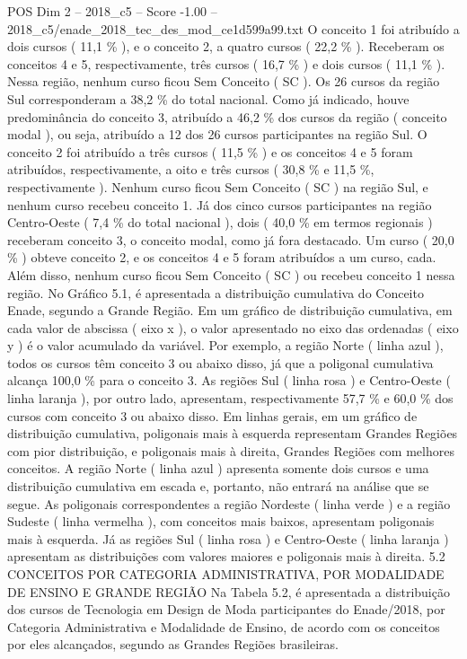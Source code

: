 \begin{textsample}{POS Dim 2 – 2018\_c5 – Score -1.00 – 2018\_c5/enade\_2018\_tec\_des\_mod\_ce1d599a99.txt}
O conceito 1 foi atribuído a dois cursos ( 11,1 \% ), e o conceito 2, a quatro cursos ( 22,2 \% ).
Receberam os conceitos 4 e 5, respectivamente, três cursos ( 16,7 \% ) e dois cursos ( 11,1 \% ).
Nessa região, nenhum curso ficou Sem Conceito ( SC ).
Os 26 cursos da região Sul corresponderam a 38,2 \% do total nacional.
Como já indicado, houve predominância do conceito 3, atribuído a 46,2 \% dos cursos da região ( conceito modal ), ou seja, atribuído a 12 dos 26 cursos participantes na região Sul.
O conceito 2 foi atribuído a três cursos ( 11,5 \% ) e os conceitos 4 e 5 foram atribuídos, respectivamente, a oito e três cursos ( 30,8 \% e 11,5 \%, respectivamente ).
Nenhum curso ficou Sem Conceito ( SC ) na região Sul, e nenhum curso recebeu conceito 1.
Já dos cinco cursos participantes na região Centro-Oeste ( 7,4 \% do total nacional ), dois ( 40,0 \% em termos regionais ) receberam conceito 3, o conceito modal, como já fora destacado.
Um curso ( 20,0 \% ) obteve conceito 2, e os conceitos 4 e 5 foram atribuídos a um curso, cada.
Além disso, nenhum curso ficou Sem Conceito ( SC ) ou recebeu conceito 1 nessa região.
No Gráfico 5.1, é apresentada a distribuição cumulativa do Conceito Enade, segundo a Grande Região.
Em um gráfico de distribuição cumulativa, em cada valor de abscissa ( eixo x ), o valor apresentado no eixo das ordenadas ( eixo y ) é o valor acumulado da variável.
Por exemplo, a região Norte ( linha azul ), todos os cursos têm conceito 3 ou abaixo disso, já que a poligonal cumulativa alcança 100,0 \% para o conceito 3.
As regiões Sul ( linha rosa ) e Centro-Oeste ( linha laranja ), por outro lado, apresentam, respectivamente 57,7 \% e 60,0 \% dos cursos com conceito 3 ou abaixo disso.
Em linhas gerais, em um gráfico de distribuição cumulativa, poligonais mais à esquerda representam Grandes Regiões com pior distribuição, e poligonais mais à direita, Grandes Regiões com melhores conceitos.
A região Norte ( linha azul ) apresenta somente dois cursos e uma distribuição cumulativa em escada e, portanto, não entrará na análise que se segue.
As poligonais correspondentes a região Nordeste ( linha verde ) e a região Sudeste ( linha vermelha ), com conceitos mais baixos, apresentam poligonais mais à esquerda.
Já as regiões Sul ( linha rosa ) e Centro-Oeste ( linha laranja ) apresentam as distribuições com valores maiores e poligonais mais à direita. 5.2 CONCEITOS POR CATEGORIA ADMINISTRATIVA, POR MODALIDADE DE ENSINO E GRANDE REGIÃO Na Tabela 5.2, é apresentada a distribuição dos cursos de Tecnologia em Design de Moda participantes do Enade/2018, por Categoria Administrativa e Modalidade de Ensino, de acordo com os conceitos por eles alcançados, segundo as Grandes Regiões brasileiras.

\end{textsample}
